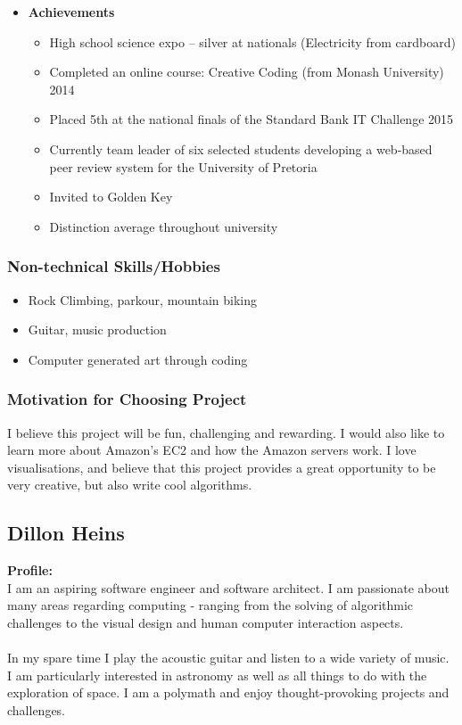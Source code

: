 \documentclass{article}
\begin{document}
\begin{itemize}
		\item \textbf{Achievements}
		\begin{itemize}
			\item High school science expo – silver at nationals (Electricity from cardboard)
			\item Completed an online course: Creative Coding (from Monash University) 2014
			\item Placed 5th at the national finals of the Standard Bank IT Challenge 2015
			\item Currently team leader of six selected students developing a web-based peer review system for the University of Pretoria
			\item Invited to Golden Key
			\item Distinction average throughout university
		\end{itemize}
	\end{itemize}
	
	\subsubsection{Non-technical Skills/Hobbies}
	\begin{itemize}
		\item Rock Climbing, parkour, mountain biking
		\item Guitar, music production
		\item Computer generated art through coding
	\end{itemize}
	\subsubsection{Motivation for Choosing Project}
	I believe this project will be fun, challenging and rewarding. I would also like to learn more about Amazon's EC2 and how the Amazon servers work. I love visualisations, and believe that this project provides a great opportunity to be very creative, but also write cool algorithms. 
	
	\cleardoublepage
	
	\subsection{Dillon Heins}
	\textbf{Profile:}\\
	I am an aspiring software engineer and software architect. I am passionate about many areas regarding computing - ranging from the solving of algorithmic challenges to the visual design and human computer interaction aspects.
\\\\	
	In my spare time I play the acoustic guitar and listen to a wide variety of music. I am particularly interested in astronomy as well as all things to do with the exploration of space. I am a polymath and enjoy thought-provoking projects and challenges.
\end{document}
